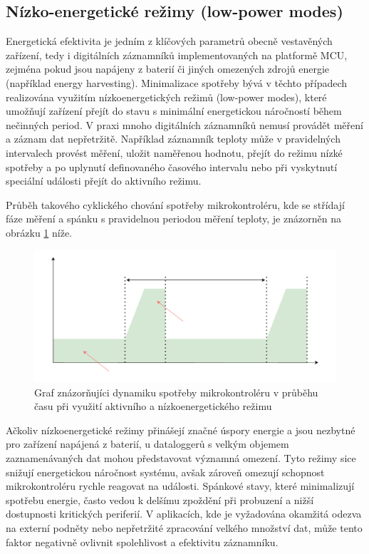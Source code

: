 \subsection{Nízko-energetické režimy (low-power modes)}
\label{nizko_energeticke_rezimy}
Energetická efektivita je jedním z klíčových parametrů obecně vestavěných zařízení, tedy i digitálních záznamníků implementovaných na platformě MCU, zejména pokud jsou napájeny z baterií či jiných omezených zdrojů energie (například energy harvesting). Minimalizace spotřeby bývá v těchto případech realizována využitím nízkoenergetických režimů (low-power modes), které umožňují zařízení přejít do stavu s minimální energetickou náročností během nečinných period. V praxi mnoho digitálních záznamníků nemusí provádět měření a záznam dat nepřetržitě. Například záznamník teploty může v pravidelných intervalech provést měření, uložit naměřenou hodnotu, přejít do režimu nízké spotřeby a po uplynutí definovaného časového intervalu nebo při vyskytnutí speciální události přejít do aktivního režimu. \cite{analog_devices_low_power_modes}

Průběh takového cyklického chování spotřeby mikrokontroléru, kde se střídají fáze měření a spánku s pravidelnou periodou měření teploty, je znázorněn na obrázku \ref{fig:low-power-modes} níže.

\begin{figure}[h]
    \centering
    \includegraphics[width=1.00\textwidth]{obrazky-figures/low_power_modes-cz.pdf}
    
    \caption{Graf znázorňujíci dynamiku spotřeby mikrokontroléru v průběhu času při využití aktivního a nízkoenergetického režimu}
    \label{fig:low-power-modes}
\end{figure}

Ačkoliv nízkoenergetické režimy přinášejí značné úspory energie a jsou nezbytné pro zařízení napájená z baterií, u dataloggerů s velkým objemem zaznamenávaných dat mohou představovat významná omezení. Tyto režimy sice snižují energetickou náročnost systému, avšak zároveň omezují schopnost mikrokontroléru rychle reagovat na události. Spánkové stavy, které minimalizují spotřebu energie, často vedou k delšímu zpoždění při probuzení a nižší dostupnosti kritických periferií. V aplikacích, kde je vyžadována okamžitá odezva na externí podněty nebo nepřetržité zpracování velkého množství dat, může tento faktor negativně ovlivnit spolehlivost a efektivitu záznamníku. \cite{embedded_low_power_modes}

